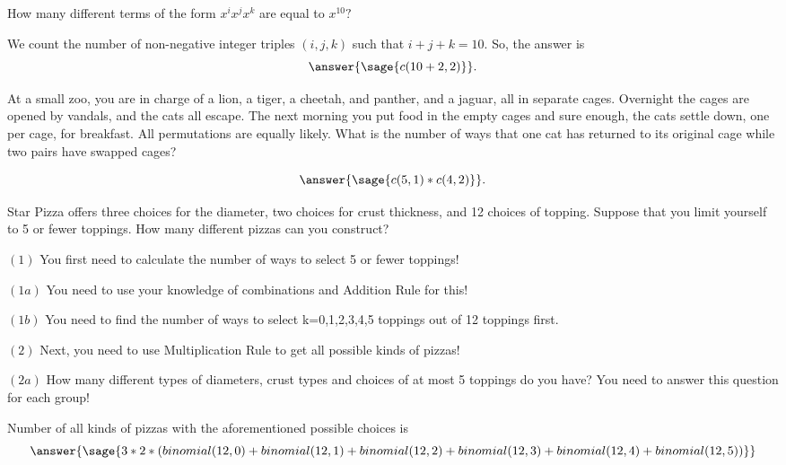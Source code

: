 \documentclass{ximera}
\begin{document}
\begin{problem} 
How many different terms of the form $x^ix^jx^k$ are equal to $x^{10}?$

\begin{explanation}
We count the number of non-negative integer triples $(i,j,k)$ such that $i+j+k=10$. So, the answer is 
   $$\answer{\sage{c(10+2,2)}}.$$
\end{explanation}
\end{problem}


\begin{problem} 
At a small zoo, you are in charge of a lion, a tiger, a cheetah, and panther, and a jaguar, all in separate cages. Overnight the cages are opened by vandals, and the cats all escape. The next morning you put food in the empty cages and sure enough, the cats settle down, one per cage, for breakfast. All permutations are equally likely. What is the number of ways that one cat has returned to its original cage while two pairs have swapped cages? 

\begin{explanation}
   $$\answer{\sage{c(5,1)*c(4,2)}}.$$
\end{explanation}
\end{problem}

\begin{problem} 
 Star Pizza offers three choices for the diameter,
two choices for crust thickness, and 12 choices of topping.   Suppose
that you limit yourself to 5 or fewer toppings.   How many different
pizzas can you construct?
\begin{hint}
    \item[$(1)$] You first need to calculate the number of ways to select 5 or fewer toppings!
        \begin{hint}
            \item[$(1a)$] You need to use your knowledge of combinations and Addition Rule for this!
            \item[$(1b)$] You need to find the number of ways to select k=0,1,2,3,4,5 toppings out of 12 toppings first. 
        \end{hint}
    \item[$(2)$] Next, you need to use Multiplication Rule to get all possible kinds of pizzas!
        \begin{hint} $(2a)$
            How many different types of diameters, crust types and choices of at most 5 toppings do you have? You need to answer this question for each group!
        \end{hint}
\end{hint}

\begin{explanation}
    Number of all kinds of pizzas with the aforementioned possible choices is $$\answer{\sage{3*2*(binomial(12,0)+binomial(12,1)+binomial(12,2)+binomial(12,3)+binomial(12,4)+binomial(12,5))} }$$
\end{explanation}
\end{problem}
\end{document}
